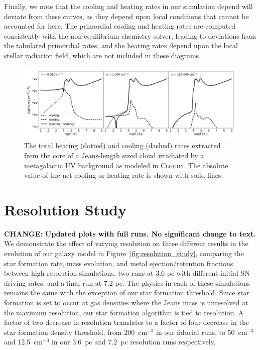 \documentclass[twocolumn]{aastex61}
\begin{document}
Finally, we note that the cooling and heating rates in our simulation depend will deviate from these curves, as they depend upon local conditions that cannot be accounted for here. The primordial cooling and heating rates are computed consistently with the non-equilibrium chemistry solver, leading to deviations from the tabulated primordial rates, and the heating rates depend upon the local stellar radiation field, which are not included in these diagrams.


\begin{figure}
\centering
\includegraphics[width=0.95\linewidth]{cooling_curve}
\caption{The total heating (dotted) and cooling (dashed) rates extracted from the core of a Jeans-length sized cloud irradiated by a \citet{HM2012} metagalactic UV background as modeled in \textsc{Cloudy}. The absolute value of the net cooling or heating
rate is shown with solid lines.}
\label{fig:cooling}
\end{figure}

\setcounter{figure}{0}
\section{Resolution Study}
\label{appendix:resolution_study}
\textbf{CHANGE: Updated plots with full runs. No significant change to text.}
We demonstrate the effect of varying resolution on three different results in the evolution of our galaxy model in Figure~\ref{fig:resolution_study}, comparing the star formation rate, mass evolution, and metal ejection/retention fractions between high resolution simulations, two runs at 3.6 pc with different initial SN driving rates, and a final run at 7.2 pc. The physics in each of these simulations remains the same with the exception of our star formation threshold. Since star formation is set to occur at gas densities where the Jeans mass is unresolved at the maximum resolution, our star formation algorithm is tied to resolution. A factor of two decrease in resolution translates to a factor of four decrease in the star formation density threshold, from 200~cm$^{-3}$ in our fiducial runs, to 50~cm$^{-3}$ and 12.5~cm$^{-3}$ in our 3.6~pc and 7.2~pc resolution runs respectively. 
\end{document}
